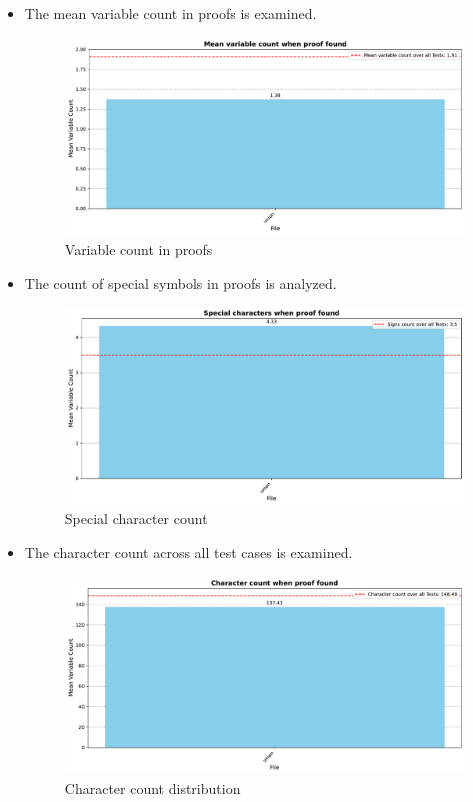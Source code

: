 \documentclass[english,version-2020-11]{uzl-thesis}
\begin{document}
\begin{itemize}
    \item The mean variable count in proofs is examined.
    \begin{figure}[h!]
        \centering
        \includegraphics[width=\textwidth]{variable_count_noauto.pdf}
        \caption{Variable count in proofs}
        \label{fig:variable_count}
    \end{figure}
    \FloatBarrier

    \item The count of special symbols in proofs is analyzed.
    \begin{figure}[h!]
        \centering
        \includegraphics[width=\textwidth]{signs_count_noauto.pdf}
        \caption{Special character count}
        \label{fig:count_signs}
    \end{figure}

    \item The character count across all test cases is examined.
    \begin{figure}[h!]
        \centering
        \includegraphics[width=\textwidth]{character_count_noauto.pdf}
        \caption{Character count distribution}
        \label{fig:character_count}
    \end{figure}


\end{itemize}
\end{document}
